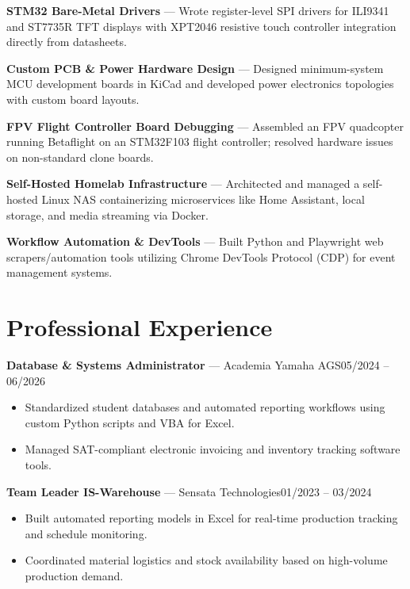 \documentclass[10.5pt,a4paper]{article}
\begin{document}
\vspace{0.15em}
\textbf{STM32 Bare-Metal Drivers} --- Wrote register-level SPI drivers for ILI9341 and ST7735R TFT displays with XPT2046 resistive touch controller integration directly from datasheets.

\vspace{0.15em}
\textbf{Custom PCB \& Power Hardware Design} --- Designed minimum-system MCU development boards in KiCad and developed power electronics topologies with custom board layouts.

\vspace{0.15em}
\textbf{FPV Flight Controller Board Debugging} --- Assembled an FPV quadcopter running Betaflight on an STM32F103 flight controller; resolved hardware issues on non-standard clone boards.

\vspace{0.15em}
\textbf{Self-Hosted Homelab Infrastructure} --- Architected and managed a self-hosted Linux NAS containerizing microservices like Home Assistant, local storage, and media streaming via Docker.

\vspace{0.15em}
\textbf{Workflow Automation \& DevTools} --- Built Python and Playwright web scrapers/automation tools utilizing Chrome DevTools Protocol (CDP) for event management systems.

\section*{Professional Experience}

\textbf{Database \& Systems Administrator} --- Academia Yamaha AGS\hfill 05/2024 -- 06/2026
\begin{itemize}
	\item Standardized student databases and automated reporting workflows using custom Python scripts and VBA for Excel.
	\item Managed SAT-compliant electronic invoicing and inventory tracking software tools.
\end{itemize}

\textbf{Team Leader IS-Warehouse} --- Sensata Technologies\hfill 01/2023 -- 03/2024
\begin{itemize}
	\item Built automated reporting models in Excel for real-time production tracking and schedule monitoring.
	\item Coordinated material logistics and stock availability based on high-volume production demand.
\end{itemize}
\end{document}
